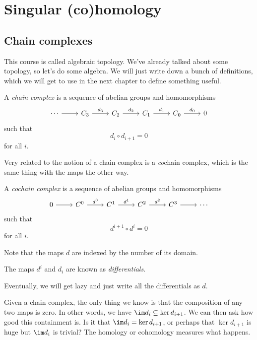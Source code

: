 \documentclass[a4paper]{article}
\theoremstyle{definition}
\begin{document}
\section{Singular (co)homology}
\subsection{Chain complexes}
This course is called algebraic topology. We've already talked about some topology, so let's do some algebra. We will just write down a bunch of definitions, which we will get to use in the next chapter to define something useful.

\begin{defi}
  A \emph{chain complex} is a sequence of abelian groups and homomorphisms
  \[
    \begin{tikzcd}
      \cdots \ar[r] & C_3 \ar[r, "d_3"] & C_2 \ar[r, "d_2"] & C_1 \ar[r, "d_1"] & C_0 \ar[r, "d_0"] & 0
    \end{tikzcd}
  \]
  such that
  \[
    d_i \circ d_{i + 1} = 0
  \]
  for all $i$.
\end{defi}

Very related to the notion of a chain complex is a \emph{co}chain complex, which is the same thing with the maps the other way.

\begin{defi}
  A \emph{cochain complex} is a sequence of abelian groups and homomorphisms
  \[
    \begin{tikzcd}
      0 \ar[r] & C^0 \ar[r, "d^0"] & C^1 \ar[r, "d^1"] & C^2 \ar[r, "d^2"] & C^3 \ar[r] & \cdots
    \end{tikzcd}
  \]
  such that
  \[
    d^{i + 1} \circ d^i = 0
  \]
  for all $i$.
\end{defi}

Note that the maps $d$ are indexed by the number of its domain.

\begin{defi}[Differentials]
  The maps $d^i$ and $d_i$ are known as \emph{differentials}.
\end{defi}
Eventually, we will get lazy and just write all the differentials as $d$.

Given a chain complex, the only thing we know is that the composition of any two maps is zero. In other words, we have $\im d_i \subseteq \ker d_{i + 1}$. We can then ask how good this containment is. Is it that $\im d_i = \ker d_{i + 1}$, or perhaps that $\ker d_{i + 1}$ is huge but $\im d_i$ is trivial? The homology or cohomology measures what happens.
\end{document}
